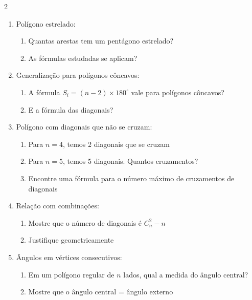 \documentclass[11pt]{article}
\begin{document}
\begin{multicols}{2}
\begin{enumerate}[leftmargin=*, start=11]
\item Polígono estrelado:
\begin{center}
\end{center}
\begin{enumerate}[label=\alph*)]
\item Quantas arestas tem um pentágono estrelado?
\item As fórmulas estudadas se aplicam?
\end{enumerate}

\item Generalização para polígonos côncavos:
\begin{enumerate}[label=\alph*)]
\item A fórmula $S_i = (n-2) \times 180^\circ$ vale para polígonos côncavos?
\item E a fórmula das diagonais?
\end{enumerate}

\item Polígono com diagonais que não se cruzam:
\begin{enumerate}[label=\alph*)]
\item Para $n=4$, temos 2 diagonais que se cruzam
\item Para $n=5$, temos 5 diagonais. Quantos cruzamentos?
\item Encontre uma fórmula para o número máximo de cruzamentos de diagonais
\end{enumerate}

\item Relação com combinações:
\begin{enumerate}[label=\alph*)]
\item Mostre que o número de diagonais é $C_n^2 - n$
\item Justifique geometricamente
\end{enumerate}

\item Ângulos em vértices consecutivos:
\begin{enumerate}[label=\alph*)]
\item Em um polígono regular de $n$ lados, qual a medida do ângulo central?
\item Mostre que o ângulo central = ângulo externo
\end{enumerate}


\end{enumerate}
\end{multicols}
\end{document}

